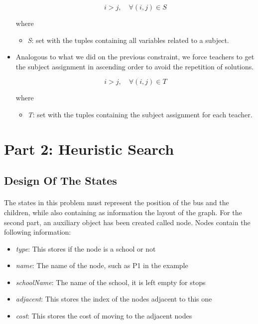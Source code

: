 \begin{itemize}
    \begin{equation}
    \label{eq: part 1 - no subject duplication}
        i > j, \quad \forall (i, j) \in S
    \end{equation}
    
    where
    
    \begin{itemize}
        \item[] \textit{S}: set with the tuples containing all variables related to a subject. 
    \end{itemize}
    
    \item Analogous to what we did on the previous constraint, we force teachers to get the subject assignment in ascending order to avoid the repetition of solutions.
    
    \begin{equation}
        i > j, \quad \forall (i, j) \in T
    \end{equation}
    
    where
    
    \begin{itemize}
        \item[] \textit{T}: set with the tuples containing the subject assignment for each teacher. 
    \end{itemize}
    
\end{itemize}



\section{Part 2: Heuristic Search}

\subsection{Design Of The States}
\paragraph{}
The states in this problem must represent the position of the bus and the children, while also containing as information the layout of the graph. For the second part, an auxiliary object has been created called node. Nodes contain the following information:

\begin{itemize}
    \item[] \textit{type}: This stores if the node is a school or not
    \item[] \textit{name}: The name of the node, such as P1 in the example 
    \item[] \textit{schoolName}: The name of the school, it is left empty for stops 
    \item[] \textit{adjacent}: This stores the index of the nodes adjacent to this one 
    \item[] \textit{cost}: This stores the cost of moving to the adjacent nodes
\end{itemize}

